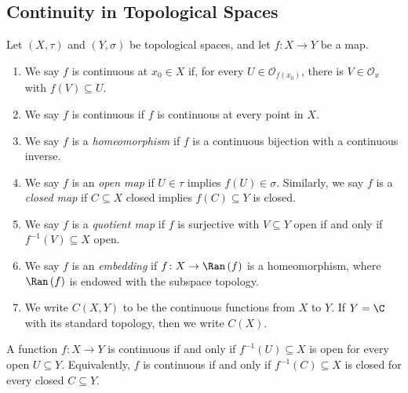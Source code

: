 \subsection{Continuity in Topological Spaces}%
\begin{definition}
  Let $\left(X,\tau\right)$ and $\left(Y,\sigma\right)$ be topological spaces, and let $f\colon X\rightarrow Y$ be a map.
  \begin{enumerate}[(1)]
    \item We say $f$ is continuous at $x_0\in X$ if, for every $U\in \mathcal{O}_{f\left(x_0\right)}$, there is $V\in \mathcal{O}_{x}$ with $f\left(V\right)\subseteq U$.
    \item We say $f$ is continuous if $f$ is continuous at every point in $X$.
    \item We say $f$ is a \textit{homeomorphism} if $f$ is a continuous bijection with a continuous inverse.
    \item We say $f$ is an \textit{open map} if $U\in \tau$ implies $f\left(U\right)\in \sigma$. Similarly, we say $f$ is a \textit{closed map} if $C\subseteq X$ closed implies $f\left(C\right)\subseteq Y$ is closed.
    \item We say $f$ is a \textit{quotient map} if $f$ is surjective with $V\subseteq Y$ open if and only if $f^{-1}\left(V\right)\subseteq X$ open.
    \item We say $f$ is an \textit{embedding} if $f\colon X\rightarrow \Ran\left(f\right)$ is a homeomorphism, where $\Ran\left(f\right)$ is endowed with the subspace topology.
    \item We write $C\left(X,Y\right)$ to be the continuous functions from $X$ to $Y$. If $Y = \C$ with its standard topology, then we write $C\left(X\right)$.
  \end{enumerate}
\end{definition}
\begin{fact}
  A function $f\colon X\rightarrow Y$ is continuous if and only if $f^{-1}\left(U\right)\subseteq X$ is open for every open $U\subseteq Y$. Equivalently, $f$ is continuous if and only if $f^{-1}\left(C\right)\subseteq X$ is closed for every closed $C\subseteq Y$.
\end{fact}

